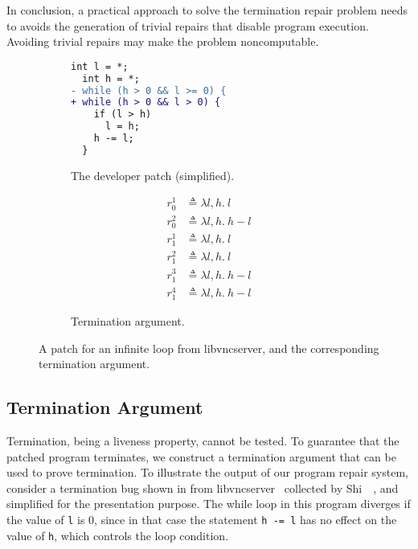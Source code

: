 In conclusion, a practical approach to solve the termination repair problem needs to avoids the generation of trivial repairs that disable program execution. Avoiding trivial repairs may make the problem noncomputable.

\begin{figure*}[t]
  \centering
  \begin{subfigure}[b]{0.48\textwidth}
    \begin{lstlisting}[language=diff]
  int l = *;
  int h = *;
- while (h > 0 && l >= 0) {
+ while (h > 0 && l > 0) {
    if (l > h)
      l = h;
    h -= l;
  }
\end{lstlisting}
 	  \caption{The developer patch (simplified).}
	  \label{fig:buggy_program}
  \end{subfigure}
\hfill
\begin{subfigure}[b]{0.48\textwidth}
  \begin{align*}
    r_0^1 &\triangleq \lambda l, h.\ l\\
    r_0^2 &\triangleq \lambda l, h.\ h - l\\
    r_1^1 &\triangleq \lambda l, h.\ l\\
    r_1^2 &\triangleq \lambda l, h.\ l\\
    r_1^3 &\triangleq \lambda l, h.\ h - l\\
    r_1^4 &\triangleq \lambda l, h.\ h - l
\end{align*}
	  \caption{Termination argument.}
	  \label{fig:argument}
  \end{subfigure}
  \caption{A patch for an infinite loop from libvncserver, and the corresponding termination argument.}
	\label{fig:motivating}
\end{figure*}


\subsection{Termination Argument}

Termination, being a liveness property, cannot be tested. To guarantee that the patched program terminates, we construct a termination argument that can be used to prove termination. To illustrate the output of our program repair system, consider a termination bug shown in  from libvncserver~\cite{libvncserverBugURL} collected by Shi~\etal~\cite{shi2022lsa}, and simplified for the presentation purpose. The while loop in this program diverges if the value of \lstinline{l} is 0, since in that case the statement \lstinline{h -= l} has no effect on the value of \lstinline{h}, which controls the loop condition.


